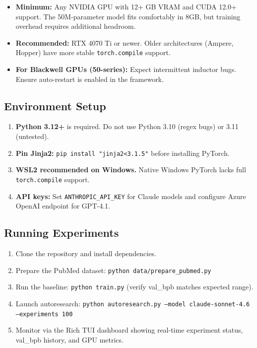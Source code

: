 \documentclass[11pt]{article}
\begin{document}
\begin{itemize}[leftmargin=*]
    \item \textbf{Minimum:} Any NVIDIA GPU with 12+ GB VRAM and CUDA 12.0+ support. The 50M-parameter model fits comfortably in 8GB, but training overhead requires additional headroom.
    \item \textbf{Recommended:} RTX 4070 Ti or newer. Older architectures (Ampere, Hopper) have more stable \texttt{torch.compile} support.
    \item \textbf{For Blackwell GPUs (50-series):} Expect intermittent inductor bugs. Ensure auto-restart is enabled in the framework.
\end{itemize}

\subsection{Environment Setup}
\label{sec:env_setup}

\begin{enumerate}[leftmargin=*]
    \item \textbf{Python 3.12+} is required. Do not use Python 3.10 (regex bugs) or 3.11 (untested).
    \item \textbf{Pin Jinja2:} \texttt{pip install "jinja2<3.1.5"} before installing PyTorch.
    \item \textbf{WSL2 recommended on Windows.} Native Windows PyTorch lacks full \texttt{torch.compile} support.
    \item \textbf{API keys:} Set \texttt{ANTHROPIC\_API\_KEY} for Claude models and configure Azure OpenAI endpoint for GPT-4.1.
\end{enumerate}

\subsection{Running Experiments}
\label{sec:running}

\begin{enumerate}[leftmargin=*]
    \item Clone the repository and install dependencies.
    \item Prepare the PubMed dataset: \texttt{python data/prepare\_pubmed.py}
    \item Run the baseline: \texttt{python train.py} (verify val\_bpb matches expected range).
    \item Launch autoresearch: \texttt{python autoresearch.py --model claude-sonnet-4.6 --experiments 100}
    \item Monitor via the Rich TUI dashboard showing real-time experiment status, val\_bpb history, and GPU metrics.
\end{enumerate}
\end{document}
